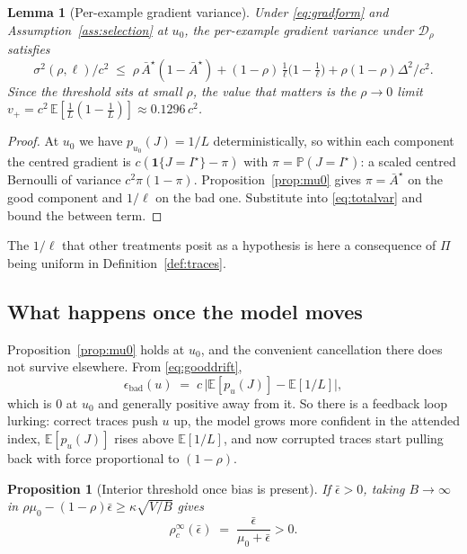 \documentclass{article}
\theoremstyle{plain}
\newtheorem{proposition}{Proposition}
\newtheorem{lemma}{Lemma}
\theoremstyle{definition}
\theoremstyle{remark}
\newcommand{\E}{\mathbb{E}}
\newcommand{\Prob}{\mathbb{P}}
\newcommand{\1}{\mathbf{1}}
\newcommand{\cD}{\mathcal{D}}
\newcommand{\bad}{\mathrm{bad}}
\begin{document}
\begin{lemma}[Per-example gradient variance]
\label{lem:variance}
Under \eqref{eq:gradform} and Assumption~\ref{ass:selection} at $u_0$, the
per-example gradient variance under $\cD_\rho$ satisfies
\begin{equation}
\label{eq:variance}
\sigma^2(\rho,\ell)/c^2
\;\le\;
\rho\,\bar A^\star(1-\bar A^\star)
+ (1-\rho)\,\tfrac1\ell\big(1-\tfrac1\ell\big)
+ \rho(1-\rho)\Delta^2/c^2 .
\end{equation}
Since the threshold sits at small $\rho$, the value that matters is the
$\rho\to0$ limit $v_+ = c^2\,\E[\tfrac1L(1-\tfrac1L)] \approx 0.1296\,c^2$.
\end{lemma}

\begin{proof}
At $u_0$ we have $p_{u_0}(J)=1/L$ deterministically, so within each component the
centred gradient is $c(\1\{J=I^\star\}-\pi)$ with $\pi=\Prob(J=I^\star)$: a
scaled centred Bernoulli of variance $c^2\pi(1-\pi)$. Proposition~\ref{prop:mu0}
gives $\pi = \bar A^\star$ on the good component and $1/\ell$ on the bad one.
Substitute into \eqref{eq:totalvar} and bound the between term.
\end{proof}

The $1/\ell$ that other treatments posit as a hypothesis is here a consequence of
$\Pi$ being uniform in Definition~\ref{def:traces}.

\subsection{What happens once the model moves}
\label{sec:bias}

Proposition~\ref{prop:mu0} holds at $u_0$, and the convenient cancellation there
does not survive elsewhere. From \eqref{eq:gooddrift},
\begin{equation}
\label{eq:bias}
\epsilon_\bad(u) \;=\; c\,\big|\E[p_u(J)] - \E[1/L]\big| ,
\end{equation}
which is $0$ at $u_0$ and generally positive away from it. So there is a feedback
loop lurking: correct traces push $u$ up, the model grows more confident in the
attended index, $\E[p_u(J)]$ rises above $\E[1/L]$, and now corrupted traces
start pulling back with force proportional to $(1-\rho)$.

\begin{proposition}[Interior threshold once bias is present]
\label{prop:interior}
If $\bar\epsilon > 0$, taking $B\to\infty$ in
$\rho\mu_0 - (1-\rho)\bar\epsilon \ge \kappa\sqrt{V/B}$ gives
\begin{equation}
\label{eq:interior}
\rho_c^\infty(\bar\epsilon) \;=\; \frac{\bar\epsilon}{\mu_0 + \bar\epsilon} > 0 .
\end{equation}
\end{proposition}
\end{document}

